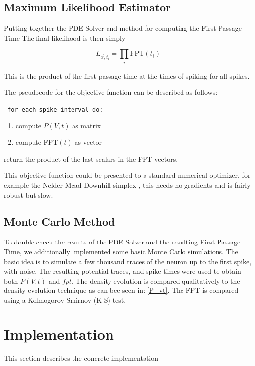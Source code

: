 \documentclass[10pt]{article}
\begin{document}
\subsection{Maximum Likelihood Estimator}

Putting together the PDE Solver and method for computing the First
Passage Time 
The final likelihood is then simply

\begin{equation}
    L_{\vec{x},t_{i}} = \prod_{i} \mathrm{FPT}(t_{i})
\end{equation}

This is the product of the first passage time at the times of
spiking for all spikes.

The pseudocode for the objective function can be described as follows:

{\tt
for each spike interval do:
\begin{enumerate}
    \item compute $P(V,t)$ as matrix
    \item compute FPT$(t)$ as vector
\end{enumerate}
return the product of the last scalars in the FPT vectors.}

This objective function could be presented to a standard numerical
optimizer, for example the Nelder-Mead Downhill simplex \cite{press},
this needs no gradients and is fairly robust but slow.

\subsection{Monte Carlo Method}

To double check the results of the PDE Solver and the resulting First
Passage Time, we additionally implemented some basic Monte Carlo
simulations. The basic idea is to simulate a few thousand traces of the neuron
up to the first spike, with noise. The resulting potential traces, and spike
times were used to obtain both $P(V,t)$ and $fpt$. The density evolution is
compared qualitatively to the density evolution technique as can bee seen in:
\ref{P_vt}. The FPT is compared using a Kolmogorov-Smirnov (K-S)
test\cite{press}.


\section{Implementation}

This section describes the concrete implementation
\end{document}

